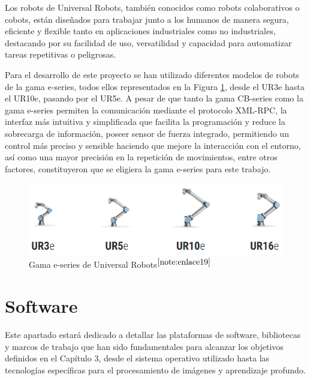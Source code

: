 Los robots de Universal Robots, también conocidos como robots colaborativos o cobots, están diseñados para trabajar junto a los humanos de manera segura, eficiente y flexible tanto en aplicaciones industriales como no industriales, destacando por su facilidad de uso, versatilidad y capacidad para automatizar tareas repetitivas o peligrosas. 

Para el desarrollo de este proyecto se han utilizado diferentes modelos de robots de la gama e-series, todos ellos representados en la Figura \ref{fig:Gama_e-series}, desde el UR3e hasta el UR10e, pasando por el UR5e.
A pesar de que tanto la gama CB-series como la gama e-series permiten la comunicación mediante el protocolo XML-RPC, la interfaz más intuitiva y simplificada que facilita la programación y reduce la sobrecarga de información, poseer sensor de fuerza integrado, permitiendo un control más preciso y sensible haciendo que mejore la interacción con el entorno, así como una mayor precisión en la repetición de movimientos, entre otros factores, constituyeron que se eligiera la gama e-series para este trabajo.

\begin{figure} [H]
    \begin{center}
      \includegraphics[width=15cm]{figs/Gama e-series.png}
    \end{center}
    \caption{Gama e-series de Universal Robots$^{\ref{note:enlace19}}$}
    \label{fig:Gama_e-series}
\end{figure}

\setcounter{footnote}{19} 


\section{Software}
\label{sec:software}

Este apartado estará dedicado a detallar las plataformas de software, bibliotecas y marcos de trabajo que han sido fundamentales para alcanzar los objetivos definidos en el Capítulo 3, desde el sistema operativo utilizado hasta las tecnologías específicas para el procesamiento de imágenes y aprendizaje profundo.

